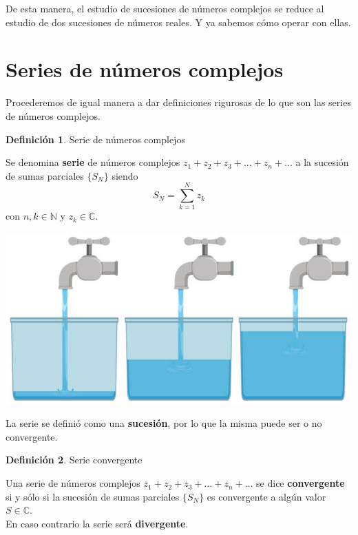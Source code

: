 \documentclass[12pt]{article}
\theoremstyle{definition}
\newtheorem{definition}{Definici\'on}[section]
\theoremstyle{theorem}
\theoremstyle{corolary}
\theoremstyle{method}
\begin{document}
De esta manera, el estudio de sucesiones de n\'umeros complejos se reduce al estudio de dos sucesiones de n\'umeros reales. Y ya sabemos c\'omo operar con ellas.

\section{Series de n\'umeros complejos}
Procederemos de igual manera a dar definiciones rigurosas de lo que son las series de n\'umeros complejos.\\

\colorbox{violet!40!white!80}{\parbox{\linewidth}{
\theoremstyle{definition}
\begin{definition}{Serie de n\'umeros complejos}

Se denomina \textbf{serie} de n\'umeros complejos $z_1+z_2+z_3+...+z_n+...$
a la sucesi\'on de sumas parciales $\{S_N\}$ siendo $$S_N = \sum\limits_{k=1}^N z_k$$ con $n, k \in \mathbb{N}$ y $z_k \in \mathbb{C}$.

\end{definition}}}
\linebreak
\linebreak

\begin{center}
	\includegraphics[scale=1.3]{series.jpg}
\end{center}

La serie se defini\'o como una \textbf{sucesi\'on}, por lo que la misma puede ser o no convergente.\\

\colorbox{violet!40!white!80}{\parbox{\linewidth}{
\theoremstyle{definition}
\begin{definition}{Serie convergente}

Una serie de n\'umeros complejos $z_1+z_2+z_3+...+z_n+...$
se dice \textbf{convergente} si y s\'olo si la sucesi\'on de sumas parciales $\{S_N\}$ es convergente a alg\'un valor $S \in \mathbb{C}$.\\
En caso contrario la serie ser\'a \textbf{divergente}.

\end{definition}}}
\linebreak
\end{document}
